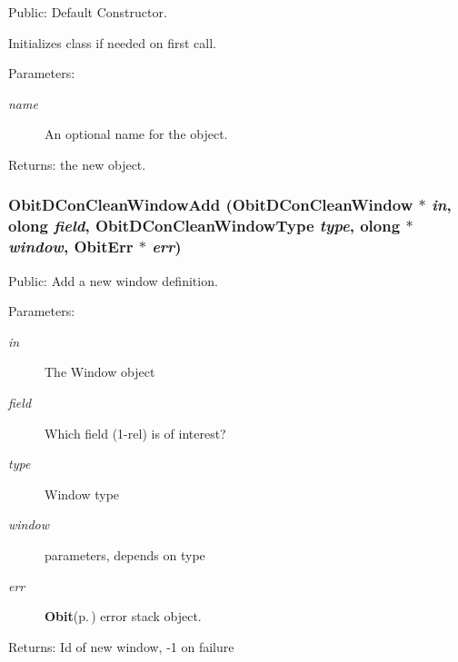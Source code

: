 Public: Default Constructor. 

Initializes class if needed on first call. \begin{Desc}
\item[Parameters:]
\begin{description}
\item[{\em name}]An optional name for the object. \end{description}
\end{Desc}
\begin{Desc}
\item[Returns:]the new object. \end{Desc}
\subsubsection{ Obit\-DCon\-Clean\-Window\-Add ({\bf Obit\-DCon\-Clean\-Window} $\ast$ {\em in}, {\bf olong} {\em field}, {\bf Obit\-DCon\-Clean\-Window\-Type} {\em type}, {\bf olong} $\ast$ {\em window}, {\bf Obit\-Err} $\ast$ {\em err})}\label{ObitDConCleanWindow_8h_a34}


Public: Add a new window definition. 

\begin{Desc}
\item[Parameters:]
\begin{description}
\item[{\em in}]The Window object \item[{\em field}]Which field (1-rel) is of interest? \item[{\em type}]Window type \item[{\em window}]parameters, depends on type \item[{\em err}]{\bf Obit}{\rm (p.\,\pageref{structObit})} error stack object. \end{description}
\end{Desc}
\begin{Desc}
\item[Returns:]Id of new window, -1 on failure \end{Desc}
